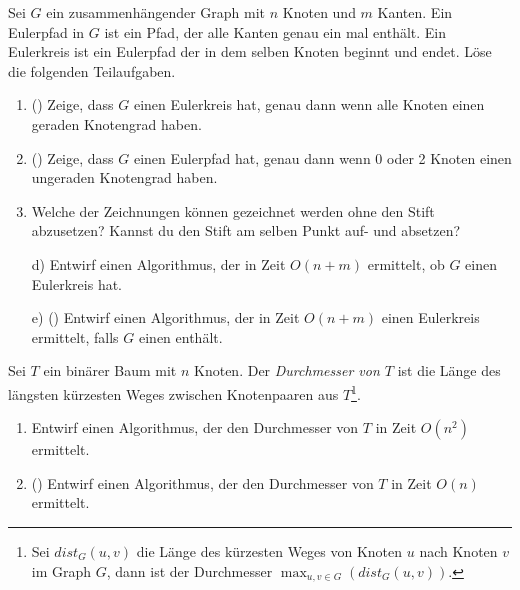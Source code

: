 \documentclass{uebung_cs}
\begin{document}
\begin{aufgabe}
	Sei $G$ ein zusammenhängender Graph mit $n$ Knoten und $m$ Kanten.
	Ein Eulerpfad in $G$ ist ein Pfad, der alle Kanten genau ein mal enthält.
	Ein Eulerkreis ist ein Eulerpfad der in dem selben Knoten beginnt und endet.
	Löse die folgenden Teilaufgaben.
	\begin{enumerate}
		\item (\hard) Zeige, dass $G$ einen Eulerkreis hat, genau dann wenn alle Knoten einen geraden Knotengrad haben.
		\item (\hard) Zeige, dass $G$ einen Eulerpfad hat, genau dann wenn 0 oder 2 Knoten einen ungeraden Knotengrad haben.
		\item Welche der Zeichnungen können gezeichnet werden ohne den Stift abzusetzen?
		Kannst du den Stift am selben Punkt auf- und absetzen?
	\end{enumerate}
\end{aufgabe}

\begin{center}
	\hspace{1.5cm}
	\hspace{1.5cm}
\end{center}
\begin{enumerate}
	\item[d)] Entwirf einen Algorithmus, der in Zeit $O(n+m)$ ermittelt, ob $G$ einen Eulerkreis hat.
	\item[e)] (\hard) Entwirf einen Algorithmus, der in Zeit $O(n+m)$ einen Eulerkreis ermittelt, falls $G$ einen enthält.
\end{enumerate}	

\begin{aufgabe}
	Sei $T$ ein binärer Baum mit $n$ Knoten.
	Der \textit{Durchmesser von $T$} ist die Länge des längsten kürzesten Weges zwischen Knotenpaaren aus $T$\footnote{Sei $dist_G(u,v)$ die Länge des kürzesten Weges von Knoten $u$ nach Knoten $v$ im Graph $G$, dann ist der Durchmesser $\max_{u,v\in G}( dist_G(u,v) )$.}.
	\begin{enumerate}
		\item Entwirf einen Algorithmus, der den Durchmesser von $T$ in Zeit $O(n^2)$ ermittelt.
		\item (\hard) Entwirf einen Algorithmus, der den Durchmesser von $T$ in Zeit $O(n)$ ermittelt.
	\end{enumerate}
\end{aufgabe}
\end{document}
